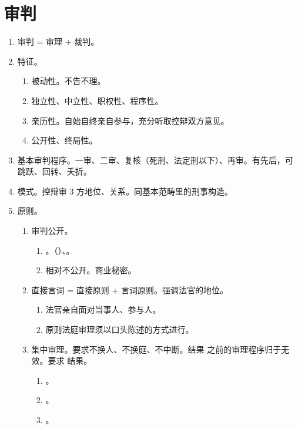 \section{审判}
\begin{enumerate}
  \item 审判 = 审理 + 裁判。
  \item 特征。
        \begin{enumerate}
          \item 被动性。不告不理。
          \item 独立性、中立性、职权性、程序性。
          \item 亲历性。自始自终亲自参与，充分听取控辩双方意见。
          \item 公开性、终局性。
        \end{enumerate}
  \item 基本审判程序。一审、二审、复核（死刑、法定刑以下）、再审。有先后，可跳跃、回转、夭折。
  \item 模式。控辩审 3 方地位、关系。同基本范畴里的刑事构造。
  \item 原则。
        \begin{enumerate}
          \item 审判公开。
                \begin{enumerate}
                  \item {}。（）、。
                  \item 相对不公开。商业秘密。
                \end{enumerate}
          \item 直接言词 = 直接原则 + 言词原则。强调法官的地位。
                \begin{enumerate}
                  \item 法官亲自面对当事人、参与人。
                  \item 原则法庭审理须以口头陈述的方式进行。
                \end{enumerate}
          \item 集中审理。要求不换人、不换庭、不中断。结果 \yjt 之前的审理程序归于无效。要求 \bdy 结果。
                \begin{enumerate}
                  \item {}。
                  \item {}。
                  \item {}。
                \end{enumerate}

\end{enumerate}
\end{enumerate}
